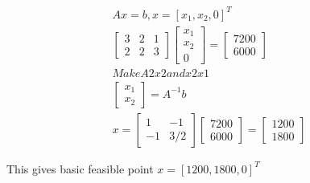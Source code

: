 \begin{subequations}
    \begin{align}
        Ax=b, x=[x_1,x_2,0]^T \\ 
        \begin{bmatrix}
            3 & 2 & 1 \\ 
            2 & 2 & 3
        \end{bmatrix}\begin{bmatrix}
            x_1\\x_2\\0
        \end{bmatrix}=\begin{bmatrix}
            7200\\6000
        \end{bmatrix}\\ 
        Make A 2x2 and x 2x1\\ 
        \begin{bmatrix}
            x_1 \\ x_2
        \end{bmatrix} = A^{-1}b \\ 
        x = \begin{bmatrix}
            1 & -1 \\ 
            -1 & 3/2
        \end{bmatrix}\begin{bmatrix}
            7200\\6000
        \end{bmatrix}=\begin{bmatrix}
            1200\\1800
        \end{bmatrix}
    \end{align}
\end{subequations}

This gives basic feasible point $x=[1200, 1800, 0]^T$

